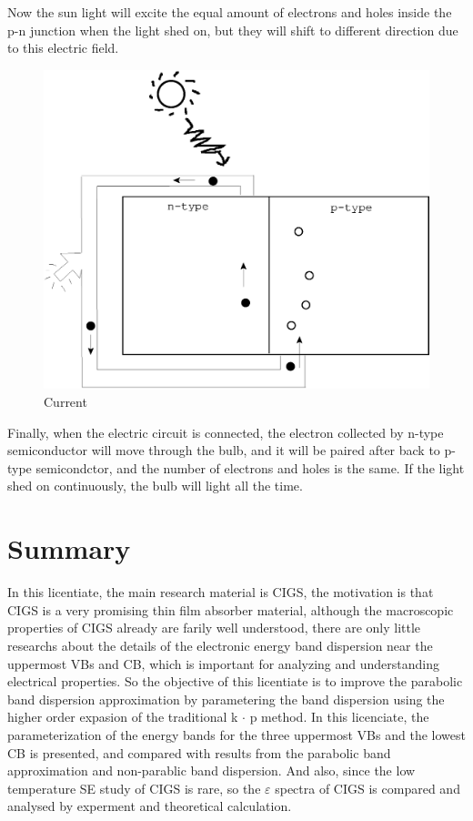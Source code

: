 \documentclass[a4paper, 12pt, titlepage,oneside,drop]{kthesis}
\begin{document}
Now the sun light will excite the equal amount of electrons and holes inside the p-n junction when the light shed on, but they will shift to different direction due
to this electric field.


\begin{figure}[H]
\centering
\includegraphics[scale=0.4]{sc6.eps}
\caption{Current}
\label{sc6}
\end{figure}


Finally, when the electric circuit is connected, the electron collected by n-type semiconductor will move through the bulb, and it will be paired after back to p-type semicondctor, and the number of
electrons and holes is the same. If the light shed on continuously, the bulb will light all the time.


\section{Summary}
In this licentiate, the main research material is CIGS, the motivation is that CIGS is a very promising thin film absorber material, although the macroscopic 
properties of CIGS already are farily well understood, there are only little researchs about the details of the electronic energy band dispersion near the uppermost
VBs and CB, which is important for analyzing and understanding electrical properties. So the objective of this licentiate is to improve the parabolic band dispersion
approximation by parametering the band dispersion using the higher order expasion of the traditional k $\cdot$ p method. In this licenciate, the parameterization of
the energy bands for the three uppermost VBs and the lowest CB is presented, and compared with results from the parabolic band approximation and non-parablic band
dispersion. And also, since the low temperature SE study of CIGS is rare, so the ${\varepsilon}$ spectra of CIGS is compared and analysed by experment and theoretical
calculation. 
\end{document}
